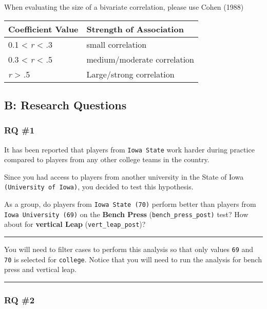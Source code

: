 \documentclass[
]{article}
\begin{document}
When evaluating the size of a bivariate correlation, please use Cohen (1988)

\begin{longtable}[]{@{}ll@{}}
\toprule
Coefficient Value & Strength of Association \\
\midrule
\endhead
0.1 \textless{} \emph{r} \textless{} .3 & small correlation \\
0.3 \textless{} \emph{r} \textless{} .5 & medium/moderate correlation \\
\emph{r} \textgreater{} .5 & Large/strong correlation \\
\bottomrule
\end{longtable}

\hypertarget{appendix-b}{%
\subsection{B: Research Questions}\label{appendix-b}}

\hypertarget{rq-1}{%
\subsubsection{RQ \#1}\label{rq-1}}

It has been reported that players from \texttt{Iowa\ State} work harder during practice compared to players from any other college teams in the country.

Since you had access to players from another university in the State of Iowa \texttt{(University\ of\ Iowa)}, you decided to test this hypothesis.

As a group, do players from \texttt{Iowa\ State\ (70)} perform better than players from \texttt{Iowa\ University\ (69)} on the \textbf{Bench Press} (\texttt{bench\_press\_post)} test? How about for \textbf{vertical Leap} (\texttt{vert\_leap\_post})?

\begin{center}\rule{0.5\linewidth}{0.5pt}\end{center}

You will need to filter cases to perform this analysis so that only values \texttt{69} and \texttt{70} is selected for \texttt{college}. Notice that you will need to run the analysis for bench press and vertical leap.

\begin{center}\rule{0.5\linewidth}{0.5pt}\end{center}

\hypertarget{rq-2}{%
\subsubsection{RQ \#2}\label{rq-2}}
\end{document}
